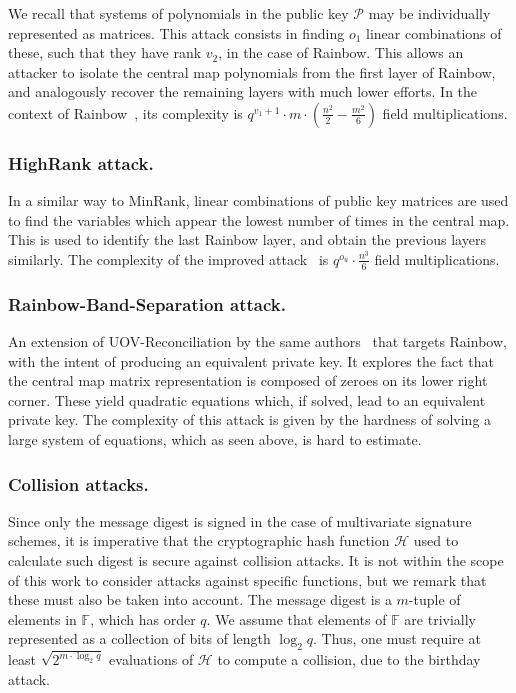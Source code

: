 \documentclass[12pt, a4paper, oneside]{memoir}
\theoremstyle{definition}
\begin{document}
We recall that systems of polynomials in the public key $\mathcal{P}$ may be individually represented as matrices. This attack consists in finding $o_{1}$ linear combinations of these, such that they have rank $v_{2}$, in the case of Rainbow. This allows an attacker to isolate the central map polynomials from the first layer of Rainbow, and analogously recover the remaining layers with much lower efforts. In the context of Rainbow~\cite{Billet:200609}, its complexity is $q^{v_{1} + 1} \cdot m \cdot (\frac{n^{2}}{2} - \frac{m^{2}}{6})$ field multiplications.

\subsubsection{HighRank attack.} 

In a similar way to MinRank, linear combinations of public key matrices are used to find the variables which appear the lowest number of times in the central map. This is used to identify the last Rainbow layer, and obtain the previous layers similarly. The complexity of the improved attack~\cite{Ding:200806} is $q^{o_{u}} \cdot \frac{n^{3}}{6}$ field multiplications.

\subsubsection{Rainbow-Band-Separation attack.} 

An extension of UOV-Reconciliation by the same authors~\cite{Ding:200806} that targets Rainbow, with the intent of producing an equivalent private key. It explores the fact that the central map matrix representation is composed of zeroes on its lower right corner. These yield quadratic equations which, if solved, lead to an equivalent private key. The complexity of this attack is given by the hardness of solving a large system of equations, which as seen above, is hard to estimate.

\subsubsection{Collision attacks.}

Since only the message digest is signed in the case of multivariate signature schemes, it is imperative that the cryptographic hash function $\mathcal{H}$ used to calculate such digest is secure against collision attacks. It is not within the scope of this work to consider attacks against specific functions, but we remark that these must also be taken into account. The message digest is a $m$-tuple of elements in $\mathbb{F}$, which has order $q$. We assume that elements of $\mathbb{F}$ are trivially represented as a collection of bits of length $\log_{2} q$. Thus, one must require at least $\sqrt{2^{m \cdot \log_{2} q}}$ evaluations of $\mathcal{H}$ to compute a collision, due to the birthday attack.
\end{document}
